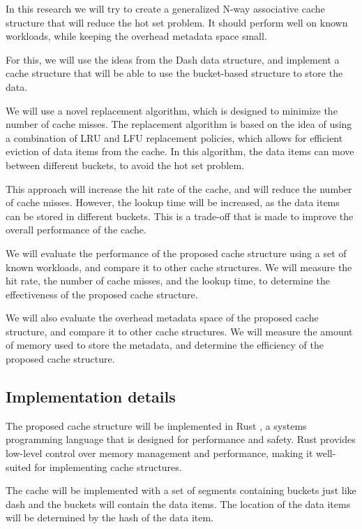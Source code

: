 \documentclass[12pt]{article}
\begin{document}
In this research we will try to create a generalized N-way associative cache structure that will reduce the hot set problem. It should perform well on known workloads, while keeping the overhead metadata space small.

For this, we will use the ideas from the Dash data structure, and implement a cache structure that will be able to use the bucket-based structure to store the data.

We will use a novel replacement algorithm, which is designed to minimize the number of cache misses. The replacement algorithm is based on the idea of using a combination of LRU and LFU replacement policies, which allows for efficient eviction of data items from the cache. In this algorithm, the data items can move between different buckets, to avoid the hot set problem.

This approach will increase the hit rate of the cache, and will reduce the number of cache misses. However, the lookup time will be increased, as the data items can be stored in different buckets. This is a trade-off that is made to improve the overall performance of the cache.

We will evaluate the performance of the proposed cache structure using a set of known workloads, and compare it to other cache structures. We will measure the hit rate, the number of cache misses, and the lookup time, to determine the effectiveness of the proposed cache structure.

We will also evaluate the overhead metadata space of the proposed cache structure, and compare it to other cache structures. We will measure the amount of memory used to store the metadata, and determine the efficiency of the proposed cache structure.

\subsection{Implementation details}

The proposed cache structure will be implemented in Rust \cite{rust}, a systems programming language that is designed for performance and safety. Rust provides low-level control over memory management and performance, making it well-suited for implementing cache structures.

The cache will be implemented with a set of segments containing buckets just like dash and the buckets will contain the data items. The location of the data items will be determined by the hash of the data item.
\end{document}
